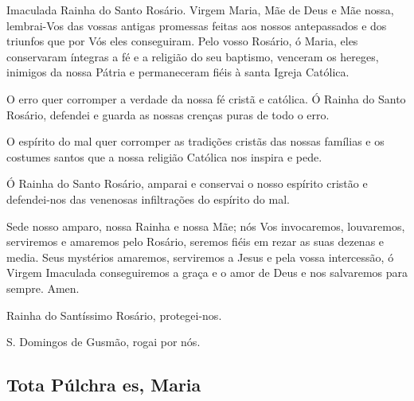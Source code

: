  Imaculada Rainha do Santo Rosário. Virgem Maria, Mãe de Deus e Mãe nossa, lembrai-Vos das vossas antigas promessas feitas aos nossos antepassados e dos triunfos que por Vós eles conseguiram. Pelo vosso Rosário, ó Maria, eles conservaram íntegras a fé e a religião do seu baptismo, venceram os hereges, inimigos da nossa Pátria e permaneceram fiéis à santa Igreja Católica.\par
O erro quer corromper a verdade da nossa fé cristã e católica. Ó Rainha do Santo Rosário, defendei e guarda as nossas crenças puras de todo o erro.\par
O espírito do mal quer corromper as tradições cristãs das nossas famílias e os costumes santos que a nossa religião Católica nos inspira e pede.\par
Ó Rainha do Santo Rosário, amparai e conservai o nosso espírito cristão e defendei-nos das venenosas infiltrações do espírito do mal.\par
Sede nosso amparo, nossa Rainha e nossa Mãe; nós Vos invocaremos, louvaremos, serviremos e amaremos pelo Rosário, seremos fiéis em rezar as suas dezenas e media. Seus mystérios amaremos, serviremos a Jesus e pela vossa intercessão, ó Virgem Imaculada conseguiremos a graça e o amor de Deus e nos salvaremos para sempre. Amen.\par
Rainha do Santíssimo Rosário, protegei-nos.\par
S. Domingos de Gusmão, rogai por nós.\par

\subsection{Tota Púlchra es, Maria}

